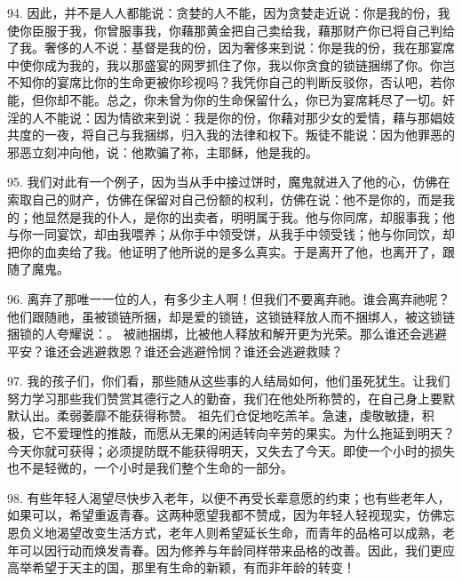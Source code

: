 94. 因此，并不是人人都能说：贪婪的人不能，因为贪婪走近说：你是我的份，我使你臣服于我，你曾服事我，你藉那黄金把自己卖给我，藉那财产你已将自己判给了我。奢侈的人不说：基督是我的份，因为奢侈来到说：你是我的份，我在那宴席中使你成为我的，我以那盛宴的网罗抓住了你，我以你贪食的锁链捆绑了你。你岂不知你的宴席比你的生命更被你珍视吗？我凭你自己的判断反驳你，否认吧，若你能，但你却不能。总之，你未曾为你的生命保留什么，你已为宴席耗尽了一切。奸淫的人不能说：因为情欲来到说：我是你的份，你藉对那少女的爱情，藉与那娼妓共度的一夜，将自己与我捆绑，归入我的法律和权下。叛徒不能说：因为他罪恶的邪恶立刻冲向他，说：他欺骗了祢，主耶稣，他是我的。\par

95. 我们对此有一个例子，因为当从手中接过饼时，魔鬼就进入了他的心，仿佛在索取自己的财产，仿佛在保留对自己份额的权利，仿佛在说：他不是你的，而是我的；他显然是我的仆人，是你的出卖者，明明属于我。他与你同席，却服事我；他与你一同宴饮，却由我喂养；从你手中领受饼，从我手中领受钱；他与你同饮，却把你的血卖给了我。他证明了他所说的是多么真实。于是离开了他，也离开了，跟随了魔鬼。\par

96. 离弃了那唯一一位的人，有多少主人啊！但我们不要离弃祂。谁会离弃祂呢？他们跟随祂，虽被锁链所捆，却是爱的锁链，这锁链释放人而不捆绑人，被这锁链捆锁的人夸耀说：。 被祂捆绑，比被他人释放和解开更为光荣。那么谁还会逃避平安？谁还会逃避救恩？谁还会逃避怜悯？谁还会逃避救赎？\par

97. 我的孩子们，你们看，那些随从这些事的人结局如何，他们虽死犹生。让我们努力学习那些我们赞赏其德行之人的勤奋，我们在他处所称赞的，在自己身上要默默认出。柔弱萎靡不能获得称赞。 祖先们仓促地吃羔羊。急速，虔敬敏捷，积极，它不爱理性的推敲，而愿从无果的闲适转向辛劳的果实。为什么拖延到明天？今天你就可获得；必须提防既不能获得明天，又失去了今天。即使一个小时的损失也不是轻微的，一个小时是我们整个生命的一部分。\par

98. 有些年轻人渴望尽快步入老年，以便不再受长辈意愿的约束；也有些老年人，如果可以，希望重返青春。这两种愿望我都不赞成，因为年轻人轻视现实，仿佛忘恩负义地渴望改变生活方式，老年人则希望延长生命，而青年的品格可以成熟，老年可以因行动而焕发青春。因为修养与年龄同样带来品格的改善。因此，我们更应高举希望于天主的国，那里有生命的新颖，有而非年龄的转变！\par

